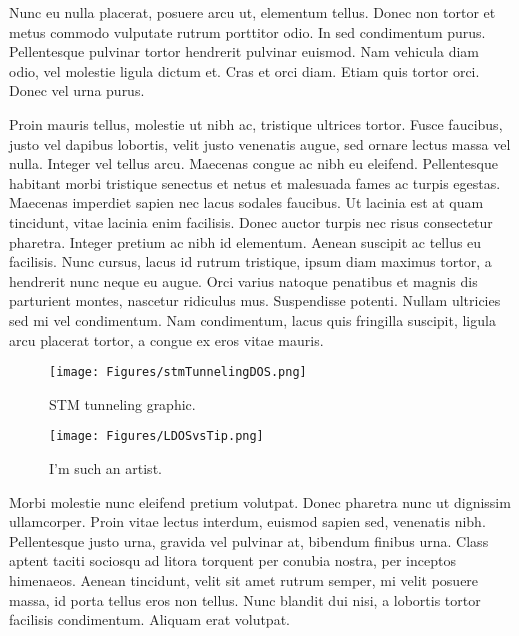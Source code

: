 Nunc eu nulla placerat, posuere arcu ut, elementum tellus. Donec non tortor et metus commodo vulputate rutrum porttitor odio. In sed condimentum purus. Pellentesque pulvinar tortor hendrerit pulvinar euismod. Nam vehicula diam odio, vel molestie ligula dictum et. Cras et orci diam. Etiam quis tortor orci. Donec vel urna purus.

Proin mauris tellus, molestie ut nibh ac, tristique ultrices tortor. Fusce faucibus, justo vel dapibus lobortis, velit justo venenatis augue, sed ornare lectus massa vel nulla. Integer vel tellus arcu. Maecenas congue ac nibh eu eleifend. Pellentesque habitant morbi tristique senectus et netus et malesuada fames ac turpis egestas. Maecenas imperdiet sapien nec lacus sodales faucibus. Ut lacinia est at quam tincidunt, vitae lacinia enim facilisis. Donec auctor turpis nec risus consectetur pharetra. Integer pretium ac nibh id elementum. Aenean suscipit ac tellus eu facilisis. Nunc cursus, lacus id rutrum tristique, ipsum diam maximus tortor, a hendrerit nunc neque eu augue. Orci varius natoque penatibus et magnis dis parturient montes, nascetur ridiculus mus. Suspendisse potenti. Nullam ultricies sed mi vel condimentum. Nam condimentum, lacus quis fringilla suscipit, ligula arcu placerat tortor, a congue ex eros vitae mauris.


    \begin{figure}
        \centering
        \texttt{[image: Figures/stmTunnelingDOS.png]}
        \caption{STM tunneling graphic. }
        \label{fig:stm}
    \end{figure}

    \begin{figure}
        \centering
        \texttt{[image: Figures/LDOSvsTip.png]}
        \caption{I'm such an artist. }
        \label{fig:stm}
    \end{figure}


Morbi molestie nunc eleifend pretium volutpat. Donec pharetra nunc ut dignissim ullamcorper. Proin vitae lectus interdum, euismod sapien sed, venenatis nibh. Pellentesque justo urna, gravida vel pulvinar at, bibendum finibus urna. Class aptent taciti sociosqu ad litora torquent per conubia nostra, per inceptos himenaeos. Aenean tincidunt, velit sit amet rutrum semper, mi velit posuere massa, id porta tellus eros non tellus. Nunc blandit dui nisi, a lobortis tortor facilisis condimentum. Aliquam erat volutpat.

